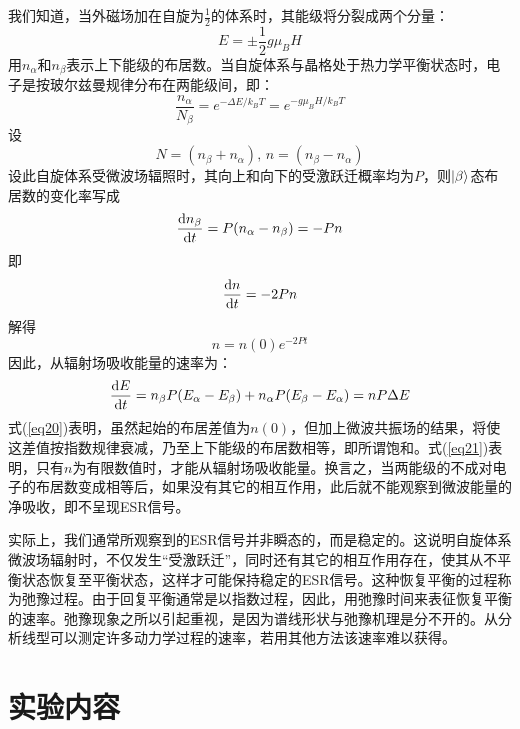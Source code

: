 \documentclass[a4paper]{article}
\begin{document}
我们知道，当外磁场加在自旋为$\frac{1}{2}$的体系时，其能级将分裂成两个分量：
\begin{equation}
E = \pm\dfrac{1}{2}g\mu_B H         \label{eq14}
\end{equation}
用$n_{\alpha}$和$n_{\beta}$表示上下能级的布居数。当自旋体系与晶格处于热力学平衡状态时，电子是按玻尔兹曼规律分布在两能级间，即：
\begin{equation}
\dfrac{n_{\alpha}}{N_{\beta}} = e^{-\Delta E/k_BT} = e^{-g\mu_B H/k_BT}                        
\label{eq15}
\end{equation}
设
\begin{equation*}
N = (n_{\beta} + n_{\alpha})  \text{, }  n = (n_{\beta} - n_{\alpha})
\end{equation*}
设此自旋体系受微波场辐照时，其向上和向下的受激跃迁概率均为$ P $，则$\ket{\beta}$态布居数的变化率写成
\begin{equation}
\dv{n_{\beta}}{t} = P(n_{\alpha} - n_{\beta}) = -Pn
\label{eq18}
\end{equation}
即
\begin{equation}
\dv{n}{t} = -2Pn        \label{eq19}
\end{equation}
解得
\begin{equation}
n = n(0)e^{-2Pt}        \label{eq20}
\end{equation}
因此，从辐射场吸收能量的速率为：
\begin{equation}
\dv{E}{t} = n_{\beta}P(E_{\alpha} - E_{\beta}) + n_{\alpha}P(E_{\beta} - E_{\alpha}) = nP\Delta E
\label{eq21}
\end{equation}
式(\ref{eq20})表明，虽然起始的布居差值为$ n(0) $，但加上微波共振场的结果，将使这差值按指数规律衰减，乃至上下能级的布居数相等，即所谓饱和。式(\ref{eq21})表明，只有$ n $为有限数值时，才能从辐射场吸收能量。换言之，当两能级的不成对电子的布居数变成相等后，如果没有其它的相互作用，此后就不能观察到微波能量的净吸收，即不呈现ESR信号。

实际上，我们通常所观察到的ESR信号并非瞬态的，而是稳定的。这说明自旋体系微波场辐射时，不仅发生“受激跃迁”，同时还有其它的相互作用存在，使其从不平衡状态恢复至平衡状态，这样才可能保持稳定的ESR信号。这种恢复平衡的过程称为弛豫过程。由于回复平衡通常是以指数过程，因此，用弛豫时间来表征恢复平衡的速率。弛豫现象之所以引起重视，是因为谱线形状与弛豫机理是分不开的。从分析线型可以测定许多动力学过程的速率，若用其他方法该速率难以获得。

\section{实验内容}
\end{document}
